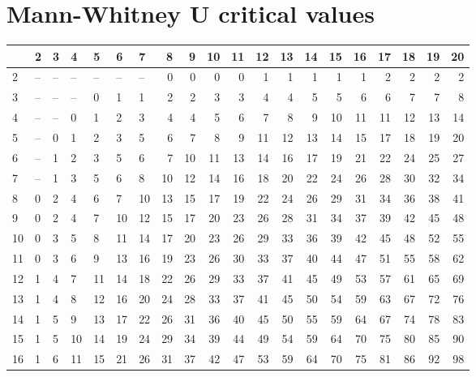 \documentclass[
]{scrbook}
\begin{document}
\hypertarget{mann-whitney-u-critical-values}{%
\section{Mann-Whitney U critical values}\label{mann-whitney-u-critical-values}}

\begin{tabular}{l|l|l|l|l|l|l|r|r|r|r|r|r|r|r|r|r|r|r|r}
\hline
  & 2 & 3 & 4 & 5 & 6 & 7 & 8 & 9 & 10 & 11 & 12 & 13 & 14 & 15 & 16 & 17 & 18 & 19 & 20\\
\hline
2 & -- & -- & -- & -- & -- & -- & 0 & 0 & 0 & 0 & 1 & 1 & 1 & 1 & 1 & 2 & 2 & 2 & 2\\
\hline
3 & -- & -- & -- & 0 & 1 & 1 & 2 & 2 & 3 & 3 & 4 & 4 & 5 & 5 & 6 & 6 & 7 & 7 & 8\\
\hline
4 & -- & -- & 0 & 1 & 2 & 3 & 4 & 4 & 5 & 6 & 7 & 8 & 9 & 10 & 11 & 11 & 12 & 13 & 14\\
\hline
5 & -- & 0 & 1 & 2 & 3 & 5 & 6 & 7 & 8 & 9 & 11 & 12 & 13 & 14 & 15 & 17 & 18 & 19 & 20\\
\hline
6 & -- & 1 & 2 & 3 & 5 & 6 & 7 & 10 & 11 & 13 & 14 & 16 & 17 & 19 & 21 & 22 & 24 & 25 & 27\\
\hline
7 & -- & 1 & 3 & 5 & 6 & 8 & 10 & 12 & 14 & 16 & 18 & 20 & 22 & 24 & 26 & 28 & 30 & 32 & 34\\
\hline
8 & 0 & 2 & 4 & 6 & 7 & 10 & 13 & 15 & 17 & 19 & 22 & 24 & 26 & 29 & 31 & 34 & 36 & 38 & 41\\
\hline
9 & 0 & 2 & 4 & 7 & 10 & 12 & 15 & 17 & 20 & 23 & 26 & 28 & 31 & 34 & 37 & 39 & 42 & 45 & 48\\
\hline
10 & 0 & 3 & 5 & 8 & 11 & 14 & 17 & 20 & 23 & 26 & 29 & 33 & 36 & 39 & 42 & 45 & 48 & 52 & 55\\
\hline
11 & 0 & 3 & 6 & 9 & 13 & 16 & 19 & 23 & 26 & 30 & 33 & 37 & 40 & 44 & 47 & 51 & 55 & 58 & 62\\
\hline
12 & 1 & 4 & 7 & 11 & 14 & 18 & 22 & 26 & 29 & 33 & 37 & 41 & 45 & 49 & 53 & 57 & 61 & 65 & 69\\
\hline
13 & 1 & 4 & 8 & 12 & 16 & 20 & 24 & 28 & 33 & 37 & 41 & 45 & 50 & 54 & 59 & 63 & 67 & 72 & 76\\
\hline
14 & 1 & 5 & 9 & 13 & 17 & 22 & 26 & 31 & 36 & 40 & 45 & 50 & 55 & 59 & 64 & 67 & 74 & 78 & 83\\
\hline
15 & 1 & 5 & 10 & 14 & 19 & 24 & 29 & 34 & 39 & 44 & 49 & 54 & 59 & 64 & 70 & 75 & 80 & 85 & 90\\
\hline
16 & 1 & 6 & 11 & 15 & 21 & 26 & 31 & 37 & 42 & 47 & 53 & 59 & 64 & 70 & 75 & 81 & 86 & 92 & 98\\

\end{tabular}
\end{document}
